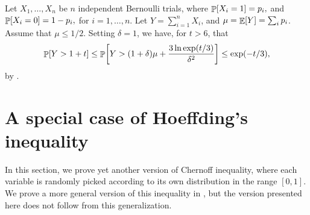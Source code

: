 \begin{example}
    Let $X_1, \ldots, X_n$ be $n$ independent Bernoulli trials, where
    \begin{math}
        \Prob{ X_i = 1 } =p_i,
    \end{math}
    and
    \begin{math}
        \Prob{ X_i = 0 } =1- p_i,
    \end{math}
    for $i=1,\ldots, n$.  Let $Y = \sum_{i=1}^{n} X_i$, and
    $\mu = \mathop{\mathbb{E}}\!\left[ { Y} \right] = \sum_i p_i$. Assume that $\mu \leq 1/2$. Setting
    $\delta=1$, we have, for $t >6$, that
    \begin{equation*}
        \Prob{Y > 1 + t} %
        \leq
        \Prob{Y > (1+\delta)\mu + \frac{3 \ln \exp( t/3 )}{\delta^2}} %
        \leq%
        \exp( -t /3 ),
    \end{equation*}
    by .
\end{example}




   \section{A special case of Hoeffding's inequality}

   In this section, we prove yet another version of Chernoff
   inequality, where each variable is randomly picked according to its
   own distribution in the range $[0,1]$. We prove a more general
   version of this inequality in , but the version
   presented here does not follow from this generalization.


